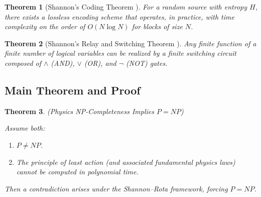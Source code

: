 \documentclass{report}
\newtheorem{theorem}{Theorem}
\begin{document}
\begin{theorem}[Shannon's Coding Theorem \cite{shannon1948mathematical}]
For a random source with entropy \(H\), there exists a lossless encoding scheme that operates, in practice, with time complexity on the order of \(O(N \log N)\) for blocks of size \(N\). 
\end{theorem}

\begin{theorem}[Shannon's Relay and Switching Theorem \cite{shannon1937relay}]
Any finite function of a finite number of logical variables can be realized by a finite switching circuit composed of \(\wedge\) (AND), \(\vee\) (OR), and \(\neg\) (NOT) gates.
\end{theorem}

\subsection{Main Theorem and Proof}

\begin{theorem}\label{thm:main}
\emph{(Physics NP-Completeness Implies \(P=NP\))}

Assume both:
\begin{enumerate}[label=(\alph*)]
    \item \(P \neq NP\).
    \item The principle of least action (and associated fundamental physics laws) cannot be computed in polynomial time.
\end{enumerate}
Then a contradiction arises under the Shannon--Rota framework, forcing \(P = NP\).
\end{theorem}
\end{document}
